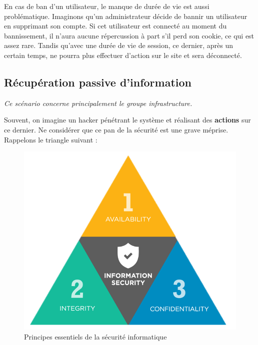 \documentclass[12pt]{article}
\begin{document}
En cas de ban d'un utilisateur, le manque de durée de vie est aussi problématique. Imaginons qu'un administrateur décide de bannir un utilisateur en supprimant son compte. Si cet utilisateur est connecté au moment du bannissement, il n'aura aucune répercussion à part s'il perd son cookie, ce qui est assez rare. Tandis qu'avec une durée de vie de session, ce dernier, après un certain temps, ne pourra plus effectuer d'action sur le site et sera déconnecté.


\subsection{Récupération passive d'information}

\emph{Ce scénario concerne principalement le groupe infrastructure.}
\medskip

Souvent, on imagine un hacker pénétrant le système et réalisant des \textbf{actions} sur ce dernier. Ne considérer que ce pan de la sécurité est une grave méprise. Rappelons le triangle suivant :

\begin{figure}[h]
\begin{center}
\includegraphics[width=.6\textwidth]{CAI.png}
\caption{Principes essentiels de la sécurité informatique}
\label{cia}
\end{center}
\end{figure}
\end{document}
